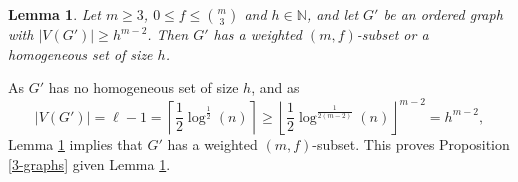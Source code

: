 \documentclass[11pt]{article}
\let\oldendproof\endproof
\renewenvironment{proof}[1][\proofname]{%
	\oldproof[\bf #1]%
}{\oldendproof}
\theoremstyle{plain}
\newtheorem{lemma}[theorem]{Lemma}
\begin{document}
\begin{proof}
\begin{lemma} \label{3-graphs induction}
    Let $m \geq 3$, $0 \leq f \leq \binom{m}{3}$ and $h \in \mathbb{N}$, and let $G'$ be an ordered graph with $|V(G')| \geq h^{m-2}$. Then $G'$ has a weighted $(m,f)$-subset or a homogeneous set of size $h$. 
\end{lemma}
    \noindent
    As $G'$ has no homogeneous set of size $h$, and as 
    $$
    |V(G')| = \ell-1 = 
    \left\lceil \frac{1}{2}\log^{\frac{1}{2}}(n) \right\rceil \geq 
    \left\lfloor \frac{1}{2}\log^{\frac{1}{2(m-2)}}(n) \right\rfloor ^{m-2} = h^{m-2},
    $$
    Lemma \ref{3-graphs induction} implies that $G'$ has a weighted $(m,f)$-subset. This proves Proposition \ref{3-graphs} given Lemma \nolinebreak \ref{3-graphs induction}. 
\end{proof}

\end{document}
